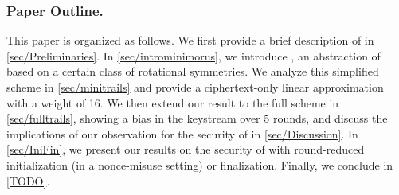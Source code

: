 \subsubsection*{Paper Outline.}
This paper is organized as follows.
We first provide a brief description of \morus in \autoref{sec/Preliminaries}.
In \autoref{sec/introminimorus}, we introduce \minimorus, an abstraction of \morus based on a certain class of rotational symmetries.
We analyze this simplified scheme in \autoref{sec/minitrails} and provide a ciphertext-only linear approximation with a weight of 16.
We then extend our result to the full scheme in \autoref{sec/fulltrails}, showing a bias in the keystream over 5 rounds,
and discuss the implications of our observation for the security of \morus in \autoref{sec/Discussion}.
In \autoref{sec/IniFin}, we present our results on the security of \morus with round-reduced initialization (in a nonce-misuse setting) or finalization.
Finally, we conclude in \autoref{TODO}.
